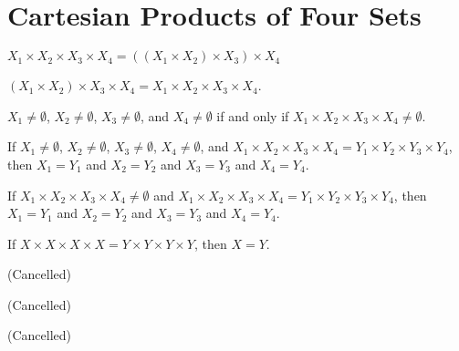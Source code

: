 \documentclass{article}
\begin{document}
\section{Cartesian Products of Four Sets}
\begin{thm}
\item\label{mcart1:49} $X_{1}\times X_{2}\times X_{3}\times X_{4}=((X_{1}\times X_{2})\times X_{3})\times X_{4}$
\item\label{mcart1:50} $(X_{1}\times X_{2})\times X_{3}\times X_{4}=X_{1}\times X_{2}\times X_{3}\times X_{4}$.
\item\label{mcart1:51} $X_{1}\neq\emptyset$, $X_{2}\neq\emptyset$,
 $X_{3}\neq\emptyset$, and $X_{4}\neq\emptyset$ if and only if $X_{1}\times X_{2}\times X_{3}\times X_{4}\neq\emptyset$.
\item\label{mcart1:52} If $X_{1}\neq\emptyset$, $X_{2}\neq\emptyset$,
 $X_{3}\neq\emptyset$, $X_{4}\neq\emptyset$, and $X_{1}\times X_{2}\times X_{3}\times X_{4}=Y_{1}\times Y_{2}\times Y_{3}\times Y_{4}$,
then $X_{1}=Y_{1}$ and $X_{2}=Y_{2}$ and $X_{3}=Y_{3}$ and $X_{4}=Y_{4}$.
\item\label{mcart1:53} If $X_{1}\times X_{2}\times X_{3}\times X_{4}\neq\emptyset$
  and $X_{1}\times X_{2}\times X_{3}\times X_{4}=Y_{1}\times Y_{2}\times Y_{3}\times Y_{4}$,
then $X_{1}=Y_{1}$ and $X_{2}=Y_{2}$ and $X_{3}=Y_{3}$ and $X_{4}=Y_{4}$.
\item\label{mcart1:54} If $X\times X\times X\times X=Y\times Y\times Y\times Y$,
  then $X=Y$.
\item\label{mcart1:55} (Cancelled)
\item\label{mcart1:56} (Cancelled)
\item\label{mcart1:57} (Cancelled)
\end{thm}
\end{document}
